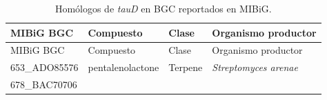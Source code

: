 \documentclass[12pt,twoside]{reedthesis}
\begin{document}
  \begin{longtable}[]{@{}llll@{}}
  \caption{Homólogos de \emph{tauD} en BGC reportados en
  MIBiG.\label{tab:tauD}}\tabularnewline
  \toprule
  \begin{minipage}[b]{0.19\columnwidth}\raggedright\strut
  MIBiG BGC\strut
  \end{minipage} & \begin{minipage}[b]{0.20\columnwidth}\raggedright\strut
  Compuesto\strut
  \end{minipage} & \begin{minipage}[b]{0.15\columnwidth}\raggedright\strut
  Clase\strut
  \end{minipage} & \begin{minipage}[b]{0.34\columnwidth}\raggedright\strut
  Organismo productor\strut
  \end{minipage}\tabularnewline
  \midrule
  \endfirsthead
  \toprule
  \begin{minipage}[b]{0.19\columnwidth}\raggedright\strut
  MIBiG BGC\strut
  \end{minipage} & \begin{minipage}[b]{0.20\columnwidth}\raggedright\strut
  Compuesto\strut
  \end{minipage} & \begin{minipage}[b]{0.15\columnwidth}\raggedright\strut
  Clase\strut
  \end{minipage} & \begin{minipage}[b]{0.34\columnwidth}\raggedright\strut
  Organismo productor\strut
  \end{minipage}\tabularnewline
  \midrule
  \endhead
  \begin{minipage}[t]{0.19\columnwidth}\raggedright\strut
  653\_ADO85576\strut
  \end{minipage} & \begin{minipage}[t]{0.20\columnwidth}\raggedright\strut
  pentalenolactone\strut
  \end{minipage} & \begin{minipage}[t]{0.15\columnwidth}\raggedright\strut
  Terpene\strut
  \end{minipage} & \begin{minipage}[t]{0.34\columnwidth}\raggedright\strut
  \emph{Streptomyces arenae}\strut
  \end{minipage}\tabularnewline
  \begin{minipage}[t]{0.19\columnwidth}\raggedright\strut
  678\_BAC70706\strut
  \end{minipage} & \begin{minipage}[t]{0.20\columnwidth}\raggedright\strut

\end{minipage}
\end{longtable}
\end{document}
